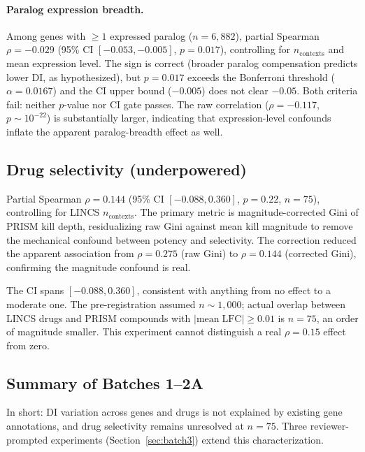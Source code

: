 \documentclass[11pt]{article}
\begin{document}
\paragraph{Paralog expression breadth.}
Among genes with $\geq 1$ expressed paralog ($n = 6{,}882$), partial
Spearman $\rho = -0.029$ (95\% CI $[-0.053, -0.005]$, $p = 0.017$),
controlling for $n_{\mathrm{contexts}}$ and mean expression level.  The
sign is correct (broader paralog compensation predicts lower DI, as
hypothesized), but $p = 0.017$ exceeds the Bonferroni threshold
($\alpha = 0.0167$) and the CI upper bound ($-0.005$) does not
clear $-0.05$.  Both criteria fail: neither $p$-value nor CI gate passes.
The raw correlation
($\rho = -0.117$, $p \sim 10^{-22}$) is substantially larger,
indicating that expression-level confounds inflate the apparent
paralog-breadth effect as well.


\subsection{Drug selectivity (underpowered)}

Partial Spearman $\rho = 0.144$ (95\% CI $[-0.088, 0.360]$,
$p = 0.22$, $n = 75$), controlling for LINCS $n_{\mathrm{contexts}}$.
The primary metric is magnitude-corrected Gini of PRISM kill depth,
residualizing raw Gini against mean kill magnitude to remove the
mechanical confound between potency and selectivity.  The correction
reduced the apparent association from $\rho = 0.275$ (raw Gini) to
$\rho = 0.144$ (corrected Gini), confirming the magnitude confound is
real.

The CI spans $[-0.088, 0.360]$, consistent with anything from no effect
to a moderate one.  The pre-registration assumed $n \sim 1{,}000$;
actual overlap between LINCS drugs and PRISM compounds with
$|\mathrm{mean\;LFC}| \geq 0.01$ is $n = 75$, an order of magnitude
smaller.  This experiment cannot distinguish a real $\rho = 0.15$ effect
from zero.


\subsection{Summary of Batches 1--2A}

In short: DI variation across genes and drugs is not explained by
existing gene annotations, and drug selectivity remains unresolved at
$n = 75$.  Three reviewer-prompted experiments
(Section~\ref{sec:batch3}) extend this characterization.


\end{document}
